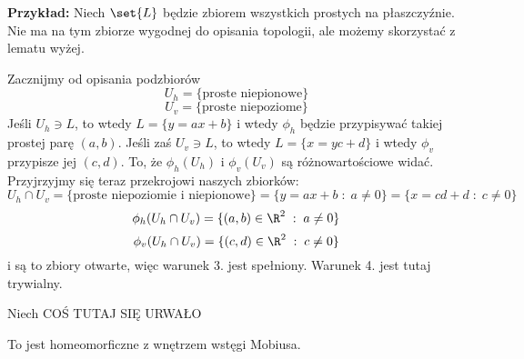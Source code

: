 \textbf{Przykład:} Niech $\set{L}$ będzie zbiorem wszystkich prostych na płaszczyźnie. Nie ma na tym zbiorze wygodnej do opisania topologii, ale możemy skorzystać z lematu wyżej.

Zacznijmy od opisania podzbiorów 
$$U_h=\{\text{proste niepionowe}\}$$
$$U_v=\{\text{proste niepoziome}\}$$
Jeśli $U_h\ni L$, to wtedy $L=\{y=ax+b\}$ i wtedy $\phi_h$ będzie przypisywać takiej prostej parę $(a, b)$. Jeśli zaś $U_v\ni L$, to wtedy $L=\{x=yc+d\}$ i wtedy $\phi_v$ przypisze jej $(c, d)$. To, że $\phi_h(U_h)$ i $\phi_v(U_v)$ są różnowartościowe widać. Przyjrzyjmy się teraz przekrojowi naszych zbiorków:
$$U_h\cap U_v=\{\text{proste niepoziomie i niepionowe}\}=\{y=ax+b\;:\;a\neq 0\}=\{x=cd+d\;:\;c\neq0\}$$
$$\phi_h(U_h\cap U_v)=\{(a,b)\in\R^2\;:\;a\neq 0\}$$
$$\phi_v(U_h\cap U_v)=\{(c,d)\in\R^2\;:\;c\neq0\}$$
i są to zbiory otwarte, więc warunek 3. jest spełniony. Warunek 4. jest tutaj trywialny.

Niech {\large\color{red}COŚ TUTAJ SIĘ URWAŁO}

To jest homeomorficzne z wnętrzem wstęgi Mobiusa.

